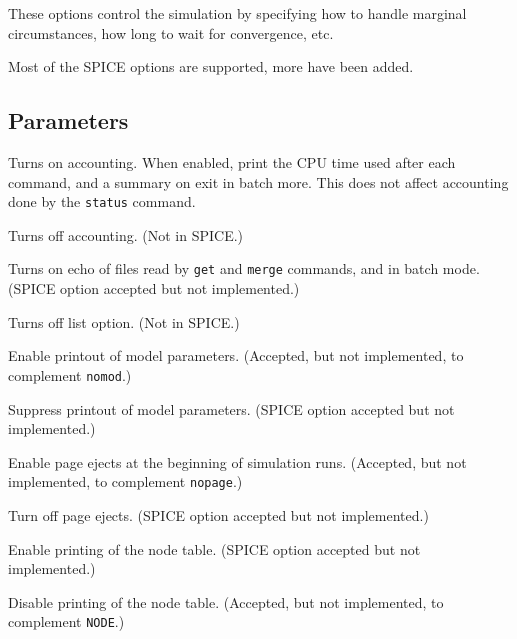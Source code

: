 These options control the simulation by specifying how to
handle marginal circumstances, how long to wait for
convergence, etc.

Most of the SPICE options are supported, more have been added.
\subsection{Parameters}

\begin{description}

\item[{\tt acct}] Turns on accounting.  When enabled, print the
CPU time used after each command, and a summary on exit in batch
more.  This does not affect accounting done by the {\tt status}
command.

\item[{\tt noacct}] Turns off accounting.  (Not in SPICE.)

\item[{\tt list}] Turns on echo of files read by {\tt get} and
{\tt merge} commands, and in batch mode.  (SPICE option accepted
but not implemented.)

\item[{\tt nolist}] Turns off list option.  (Not in SPICE.)

\item[{\tt mod}] Enable printout of model parameters.  (Accepted,
but not implemented, to complement {\tt nomod}.)

\item[{\tt nomod}] Suppress printout of model parameters.  (SPICE
option accepted but not implemented.)

\item[{\tt page}] Enable page ejects at the beginning of
simulation runs.  (Accepted, but not implemented, to complement
{\tt nopage}.)

\item[{\tt nopage}] Turn off page ejects.  (SPICE option accepted
but not implemented.)

\item[{\tt node}] Enable printing of the node table.  (SPICE
option accepted but not implemented.)

\item[{\tt nonode}] Disable printing of the node table.
(Accepted, but not implemented, to complement {\tt NODE}.)


\end{description}
